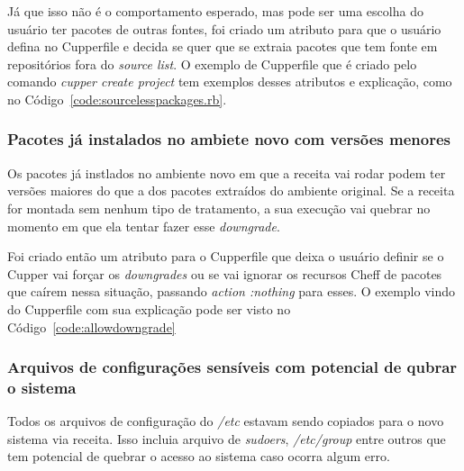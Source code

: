 Já que isso não é o comportamento esperado, mas pode ser uma escolha do usuário
ter pacotes de outras fontes, foi criado um atributo para que o usuário defina no
Cupperfile e decida se quer que se extraia pacotes que tem fonte em repositórios
fora do \textit{source list}. O exemplo de Cupperfile que é criado pelo comando
\textit{cupper create project} tem exemplos desses atributos e explicação, como
no Código~\ref{code:sourcelesspackages.rb}.

\noindent\begin{minipage}{0.7\textwidth}
  \lstset{style=shell}
  
\end{minipage}\hfill

\subsubsection{Pacotes já instalados no ambiete novo com versões menores}
Os pacotes já instlados no ambiente novo em que a receita vai rodar podem ter versões
maiores do que a dos pacotes extraídos do ambiente original. Se a receita for
montada sem nenhum tipo de tratamento, a sua execução vai quebrar no momento
em que ela tentar fazer esse \textit{downgrade}.

Foi criado então um atributo para o Cupperfile que deixa o usuário definir
se o Cupper vai forçar os \textit{downgrades} ou se vai ignorar os recursos
Cheff de pacotes que caírem nessa situação, passando \textit{action :nothing}
para esses. O exemplo vindo do Cupperfile com sua explicação pode ser visto no
Código~\ref{code:allowdowngrade}

\noindent\begin{minipage}{0.7\textwidth}
  \lstset{style=shell}
  
\end{minipage}\hfill

\subsubsection{Arquivos de configurações sensíveis com potencial de qubrar o sistema}
Todos os arquivos de configuração do \textit{/etc} estavam sendo copiados para
o novo sistema via receita. Isso incluia arquivo de \textit{sudoers}, \textit{/etc/group}
entre outros que tem potencial de quebrar o acesso ao sistema caso ocorra algum erro.

